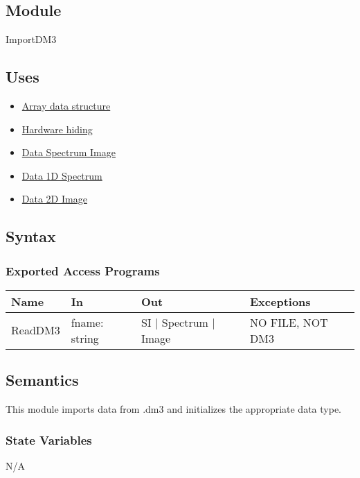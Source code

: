 \documentclass[12pt, titlepage]{article}
\begin{document}
\subsection{Module}

ImportDM3

\subsection{Uses}
\begin{itemize}
    \item \hyperref[Mod:Array]{Array data structure}
    \item \hyperref[Mod:HH]{Hardware hiding}
    \item \hyperref[Mod:SI]{Data Spectrum Image}
    \item \hyperref[Mod:Spectrum]{Data 1D Spectrum}
    \item \hyperref[Mod:Image]{Data 2D Image}
\end{itemize}

\subsection{Syntax}

\subsubsection{Exported Access Programs}

\begin{center}
    \begin{tabular}{p{2cm} p{4cm} p{4cm} p{4cm}}
        \hline
        \textbf{Name} & \textbf{In} & \textbf{Out} & \textbf{Exceptions} \\
        \hline
        ReadDM3 & fname: string & SI $|$ Spectrum $|$ Image & NO FILE, NOT DM3 \\
        \hline
    \end{tabular}
\end{center}

\subsection{Semantics}
This module imports data from .dm3 and initializes the appropriate data type.

\subsubsection{State Variables}
N/A
\end{document}
